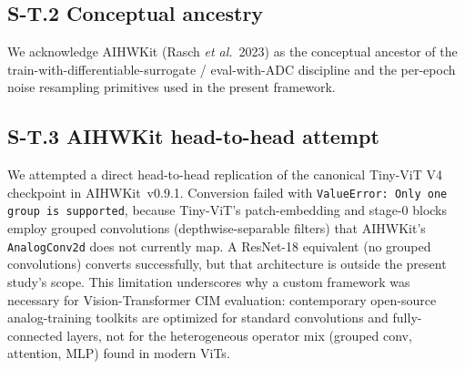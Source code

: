 \subsection*{S-T.2 Conceptual ancestry}

We acknowledge AIHWKit (Rasch \emph{et al.}\ 2023) as the conceptual ancestor of the train-with-differentiable-surrogate / eval-with-ADC discipline and the per-epoch noise resampling primitives used in the present framework.

\subsection*{S-T.3 AIHWKit head-to-head attempt}

We attempted a direct head-to-head replication of the canonical Tiny-ViT V4 checkpoint in AIHWKit~v0.9.1. Conversion failed with \texttt{ValueError: Only one group is supported}, because Tiny-ViT's patch-embedding and stage-0 blocks employ grouped convolutions (depthwise-separable filters) that AIHWKit's \texttt{AnalogConv2d} does not currently map. A ResNet-18 equivalent (no grouped convolutions) converts successfully, but that architecture is outside the present study's scope. This limitation underscores why a custom framework was necessary for Vision-Transformer CIM evaluation: contemporary open-source analog-training toolkits are optimized for standard convolutions and fully-connected layers, not for the heterogeneous operator mix (grouped conv, attention, MLP) found in modern ViTs.
